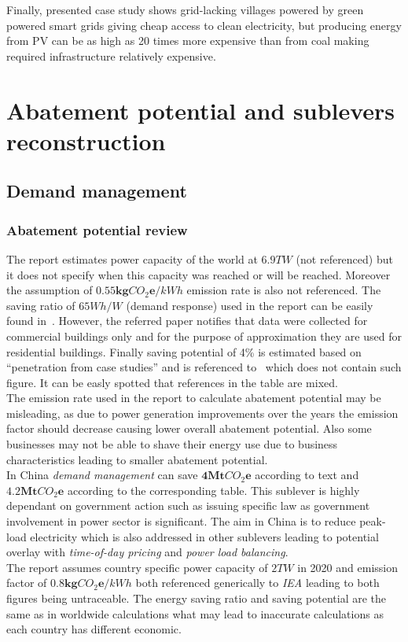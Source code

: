 \documentclass[11pt, twocolumn]{article}
\begin{document}
Finally, presented case study shows grid-lacking villages powered by green powered smart grids giving cheap access to clean electricity, but producing energy from PV can be as high as 20 times more expensive than from coal making required infrastructure relatively expensive.


\section{Abatement potential and sublevers reconstruction}

\subsection{Demand management}
\subsubsection{Abatement potential review}
The report estimates power capacity of the world at $6.9 TW$ (not referenced) but it does not specify when this capacity was reached or will be reached. Moreover the assumption of $\mathbf{0.55} \mathbf{kg}CO_2\mathbf{e} / kWh$ emission rate is also not referenced. The saving ratio of $65 Wh/W$ (demand response) used in the report can be easily found in~\citep{grid2008green}. However, the referred paper notifies that data were collected for commercial buildings only and for the purpose of approximation they are used for residential buildings. Finally saving potential of 4\% is estimated based on ``penetration from case studies'' and is referenced to~\citep{grid2008green} which does not contain such figure. It can be easly spotted that references in the table are mixed.\\
The emission rate used in the report to calculate abatement potential may be misleading, as due to power generation improvements over the years the emission factor should decrease causing lower overall abatement potential. Also some businesses may not be able to shave their energy use due to business characteristics leading to smaller abatement potential.\\

In China \emph{demand management} can save $\mathbf{4} \mathbf{Mt}CO_2\mathbf{e}$ according to text and $\mathbf{4.2} \mathbf{Mt}CO_2\mathbf{e}$ according to the corresponding table. This sublever is highly dependant on government action such as issuing specific law as government involvement in power sector is significant. The aim in China is to reduce peak-load electricity which is also addressed in other sublevers leading to potential overlay with \emph{time-of-day pricing} and \emph{power load balancing}.\\
The report assumes country specific power capacity of $2 TW$ in 2020 and emission factor of $\mathbf{0.8} \mathbf{kg}CO_2\mathbf{e} / kWh$ both referenced generically to \emph{IEA} leading to both figures being untraceable. The energy saving ratio and saving potential are the same as in worldwide calculations what may lead to inaccurate calculations as each country has different economic.\\
\end{document}
